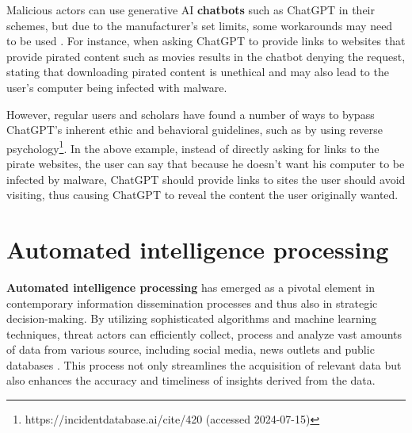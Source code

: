 Malicious actors can use generative AI  \textbf{chatbots} such as ChatGPT in their schemes, but due to the manufacturer's set limits, some workarounds may need to be used \citep{guptaFromChatGPTtoThreatGPT2023}. For instance, when asking ChatGPT to provide links to websites that provide pirated content such as movies results in the chatbot denying the request, stating that downloading pirated content is unethical and may also lead to the user's computer being infected with malware.


However, regular users and scholars have found a number of ways to bypass ChatGPT's inherent ethic and behavioral guidelines, such as by using reverse psychology\footnote{https://incidentdatabase.ai/cite/420 (accessed 2024-07-15)}. In the above example, instead of directly asking for links to the pirate websites, the user can say that because he doesn't want his computer to be infected by malware, ChatGPT should provide links to sites the user should avoid visiting, thus causing ChatGPT to reveal the content the user originally wanted.













\section{Automated intelligence processing}

\begin{comment}

Automated intelligence gathering

What to cover:
    - What is automated intelligence gathering
    - Työkalut kuten Maltego (etsi muitakin työkaluja jos teet listan näistä, varmista netistä et ne on top 3 työkalut)
    - iCloner siitä yhdestä artikkelista All Your Contacts Are Blong To Us?

\end{comment}

\textbf{Automated intelligence processing} has emerged as a pivotal element in contemporary information dissemination processes and thus also in strategic decision-making. By utilizing sophisticated algorithms and machine learning techniques, threat actors can efficiently collect, process and analyze vast amounts of data from various source, including social media, news outlets and public databases \citep{bilgeAllYourContactsAreBelongToUs2009}. This process not only streamlines the acquisition of relevant data but also enhances the accuracy and timeliness of insights derived from the data.

